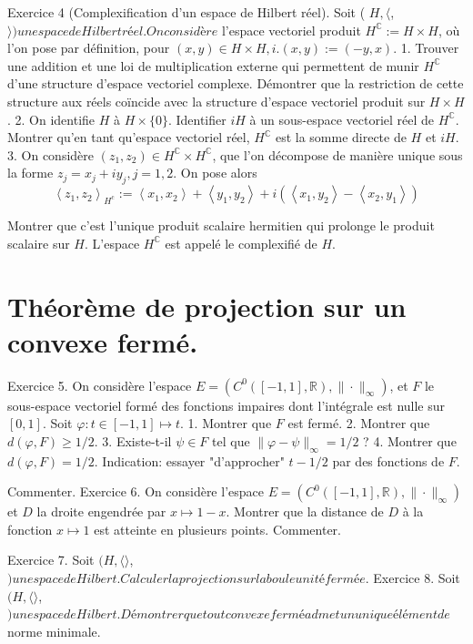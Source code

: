 \documentclass[12pt,a4paper]{article}
\begin{document}
Exercice 4 (Complexification d'un espace de Hilbert réel). Soit ( \(H,\langle\),\(\rangle ) un espace de Hilbert réel. On considère\) l'espace vectoriel produit \(H^{\mathbb{C}}:=H \times H\), où l'on pose par définition, pour \((x, y) \in H \times H, i .(x, y):=(-y, x)\).
1. Trouver une addition et une loi de multiplication externe qui permettent de munir \(H^{\mathbb{C}}\) d'une structure d'espace vectoriel complexe. Démontrer que la restriction de cette structure aux réels coïncide avec la structure d'espace vectoriel produit sur \(H \times H\).
2. On identifie \(H\) à \(H \times\{0\}\). Identifier \(i H\) à un sous-espace vectoriel réel de \(H^{\mathbb{C}}\). Montrer qu'en tant qu'espace vectoriel réel, \(H^{\mathbb{C}}\) est la somme directe de \(H\) et \(i H\).
3. On considère \(\left(z_{1}, z_{2}\right) \in H^{\mathbb{C}} \times H^{\mathbb{C}}\), que l'on décompose de manière unique sous la forme \(z_{j}=x_{j}+i y_{j}, j=1,2\). On pose alors
\[
\left\langle z_{1}, z_{2}\right\rangle_{H^{\mathrm{c}}}:=\left\langle x_{1}, x_{2}\right\rangle+\left\langle y_{1}, y_{2}\right\rangle+i\left(\left\langle x_{1}, y_{2}\right\rangle-\left\langle x_{2}, y_{1}\right\rangle\right)
\]

Montrer que c'est l'unique produit scalaire hermitien qui prolonge le produit scalaire sur \(H\).
L'espace \(H^{\mathbb{C}}\) est appelé le complexifié de \(H\).

\section*{Théorème de projection sur un convexe fermé.}

Exercice 5. On considère l'espace \(E=\left(C^{0}([-1,1], \mathbb{R}),\|\cdot\|_{\infty}\right)\), et \(F\) le sous-espace vectoriel formé des fonctions impaires dont l'intégrale est nulle sur \([0,1]\). Soit \(\varphi: t \in[-1,1] \mapsto t\).
1. Montrer que \(F\) est fermé.
2. Montrer que \(d(\varphi, F) \geqslant 1 / 2\).
3. Existe-t-il \(\psi \in F\) tel que \(\|\varphi-\psi\|_{\infty}=1 / 2\) ?
4. Montrer que \(d(\varphi, F)=1 / 2\). Indication: essayer "d'approcher" \(t-1 / 2\) par des fonctions de \(F\).

Commenter.
Exercice 6. On considère l'espace \(E=\left(C^{0}([-1,1], \mathbb{R}),\|\cdot\|_{\infty}\right)\) et \(D\) la droite engendrée par \(x \mapsto 1-x\). Montrer que la distance de \(D\) à la fonction \(x \mapsto 1\) est atteinte en plusieurs points. Commenter.

Exercice 7. Soit \((H,\langle\rangle\),\() un espace de Hilbert. Calculer la projection sur la boule unité fermée.\)
Exercice 8. Soit \((H,\langle\rangle\),\() un espace de Hilbert. Démontrer que tout convexe fermé admet un unique élément de\) norme minimale.
\end{document}
